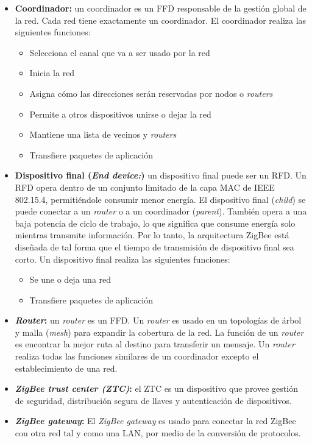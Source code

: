 \documentclass[10pt,journal,compsoc]{IEEEtran}
\begin{document}
\begin{itemize}
    \item \textbf{Coordinador:} un coordinador es un FFD responsable de la gestión global de la red. Cada red tiene exactamente un coordinador. El coordinador realiza las siguientes funciones:
    \begin{itemize}
        \item Selecciona el canal que va a ser usado por la red
        \item Inicia la red
        \item Asigna cómo las direcciones serán reservadas por nodos o \emph{routers}
        \item Permite a otros dispositivos unirse o dejar la red
        \item Mantiene una lista de vecinos y \emph{routers}
        \item Transfiere paquetes de aplicación
    \end{itemize}
    \item \textbf{Dispositivo final (\emph{End device:})} un dispositivo final puede ser un RFD. Un RFD opera dentro de un conjunto limitado de la capa MAC de IEEE 802.15.4, permitiéndole consumir menor energía. El dispositivo final (\emph{child}) se puede conectar a un \emph{router} o a un coordinador (\emph{parent}). También opera a una baja potencia de ciclo de trabajo, lo que significa que consume energía solo mientras transmite información. Por lo tanto, la arquitectura ZigBee está diseñada de tal forma que el tiempo de transmisión de dispositivo final sea corto. Un dispositivo final realiza las siguientes funciones:
    \begin{itemize}
        \item Se une o deja una red
        \item Transfiere paquetes de aplicación
    \end{itemize}
    \item \textbf{\emph{Router}:} un \emph{router} es un FFD. Un \emph{router} es usado en un topologías de árbol y malla (\emph{mesh}) para expandir la cobertura de la red. La función de un \emph{router} es encontrar la mejor ruta al destino para transferir un mensaje. Un \emph{router} realiza todas las funciones similares de un coordinador excepto el establecimiento de una red.
    \item \textbf{\emph{ZigBee trust center (ZTC)}:} el ZTC es un dispositivo que provee gestión de seguridad, distribución segura de llaves y autenticación de dispositivos.
    \item \textbf{\emph{ZigBee gateway}:} El \emph{ZigBee gateway} es usado para conectar la red ZigBee con otra red tal y como una LAN, por medio de la conversión de protocolos.
\end{itemize}
\end{document}

